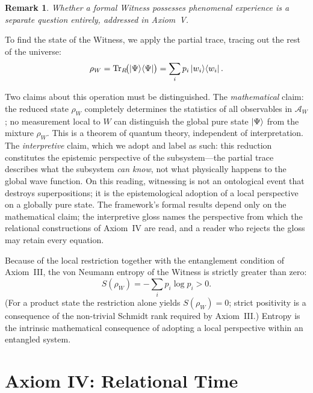 \documentclass[11pt, a4paper]{article}
\newtheorem{remark}{Remark}
\begin{document}
\begin{remark}
Whether a formal Witness possesses \emph{phenomenal experience} is a separate question entirely, addressed in Axiom~V.
\end{remark}

To find the state of the Witness, we apply the partial trace, tracing out the rest of the universe:
\begin{equation}
\rho_W = \operatorname{Tr}_R\!\bigl(\ket{\Psi}\!\bra{\Psi}\bigr) = \sum_i p_i \ket{w_i}\!\bra{w_i}.
\label{eq:rhoW}
\end{equation}

Two claims about this operation must be distinguished. The \emph{mathematical} claim: the reduced state $\rho_W$ completely determines the statistics of all observables in $\mathcal{A}_W$; no measurement local to $W$ can distinguish the global pure state $\ket{\Psi}$ from the mixture $\rho_W$. This is a theorem of quantum theory, independent of interpretation. The \emph{interpretive} claim, which we adopt and label as such: this reduction constitutes the epistemic perspective of the subsystem---the partial trace describes what the subsystem \emph{can know}, not what physically happens to the global wave function. On this reading, witnessing is not an ontological event that destroys superpositions; it is the epistemological adoption of a local perspective on a globally pure state. The framework's formal results depend only on the mathematical claim; the interpretive gloss names the perspective from which the relational constructions of Axiom~IV are read, and a reader who rejects the gloss may retain every equation.

Because of the local restriction together with the entanglement condition of Axiom~III, the von Neumann entropy of the Witness is strictly greater than zero:
\begin{equation}
S(\rho_W) = -\sum_i p_i \log p_i > 0.
\label{eq:SW}
\end{equation}
(For a product state the restriction alone yields $S(\rho_W) = 0$; strict positivity is a consequence of the non-trivial Schmidt rank required by Axiom~III.) Entropy is the intrinsic mathematical consequence of adopting a local perspective within an entangled system.

\section{Axiom IV: Relational Time}
\label{sec:axiom4}
\end{document}
